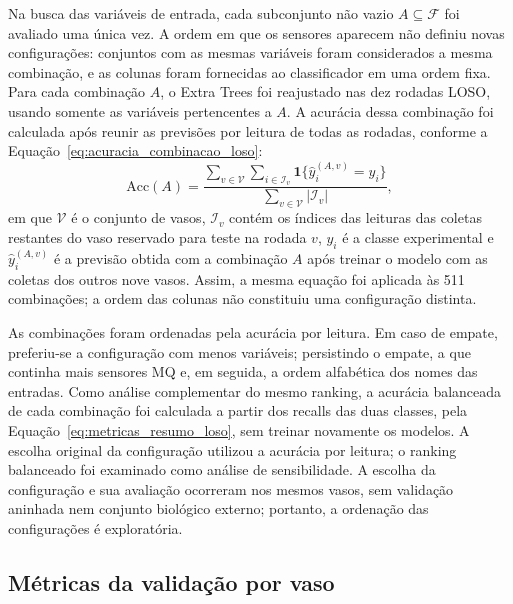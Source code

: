 Na busca das variáveis de entrada, cada subconjunto não vazio
$A\subseteq\mathcal{F}$ foi avaliado uma única vez. A ordem em que os
sensores aparecem não definiu novas configurações: conjuntos com as
mesmas variáveis foram considerados a mesma combinação, e as colunas
foram fornecidas ao classificador em uma ordem fixa. Para cada
combinação $A$, o Extra Trees foi reajustado nas dez rodadas LOSO,
usando somente as variáveis pertencentes a $A$. A acurácia dessa
combinação foi calculada após reunir as previsões por leitura de
todas as rodadas, conforme a Equação~\eqref{eq:acuracia_combinacao_loso}:
\begin{equation}
    \mathrm{Acc}(A)=
    \frac{
        \displaystyle\sum_{v\in\mathcal{V}}
        \sum_{i\in\mathcal{I}_v}
        \mathbf{1}\{\widehat{y}_{i}^{(A,v)}=y_i\}
    }{
        \displaystyle\sum_{v\in\mathcal{V}}|\mathcal{I}_v|
    },
    \label{eq:acuracia_combinacao_loso}
\end{equation}
em que $\mathcal{V}$ é o conjunto de vasos, $\mathcal{I}_v$ contém os
índices das leituras das coletas restantes do vaso reservado para
teste na rodada $v$, $y_i$ é a classe experimental e
$\widehat{y}_{i}^{(A,v)}$ é a previsão obtida com a combinação $A$
após treinar o modelo com as coletas dos outros nove vasos. Assim,
a mesma equação foi aplicada às 511 combinações; a ordem das colunas
não constituiu uma configuração distinta.

As combinações foram ordenadas pela acurácia por leitura. Em caso de
empate, preferiu-se a configuração com menos variáveis; persistindo
o empate, a que continha mais sensores MQ e, em seguida, a ordem
alfabética dos nomes das entradas. Como análise complementar do mesmo
ranking, a acurácia balanceada de cada combinação foi calculada a partir
dos recalls das duas classes, pela Equação~\eqref{eq:metricas_resumo_loso},
sem treinar novamente os modelos. A escolha original da configuração
utilizou a acurácia por leitura; o ranking balanceado foi examinado como
análise de sensibilidade. A escolha da configuração
e sua avaliação ocorreram nos mesmos vasos, sem validação aninhada
nem conjunto biológico externo; portanto, a ordenação das
configurações é exploratória.

\subsection{Métricas da validação por vaso}
\label{subsec:metricas_loso_complementar}

